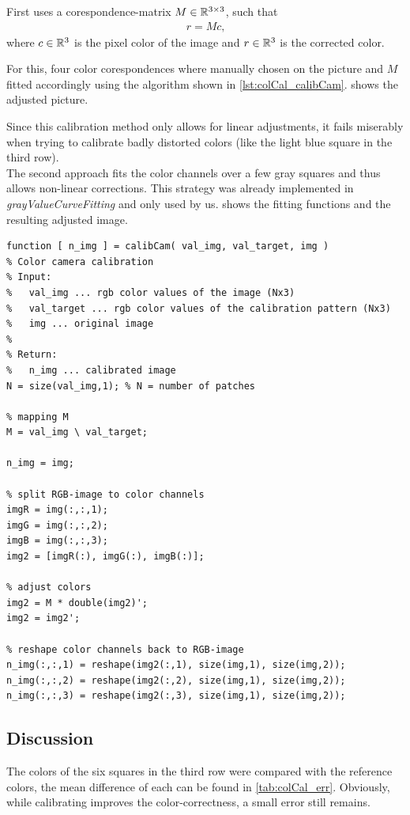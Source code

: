 \documentclass[
a4paper,     %
11pt         %
]{scrartcl}  %
\begin{document}
First uses a corespondence-matrix $M \in \mathbb{R} ^{3\times 3}$, such that
\begin{align*}  r = M c \text{,} \end{align*}
where $c \in \mathbb{R}^3$ is the pixel color of the image and $r \in \mathbb{R}^3$ is the corrected color.

For this, four color corespondences where manually chosen on the picture and $M$ fitted accordingly using the algorithm shown in \cref{lst:colCal_calibCam}.  shows the adjusted picture.

Since this calibration method only allows for linear adjustments, it fails miserably when trying to calibrate badly distorted colors (like the light blue square in the third row). \\

The second approach fits the color channels over a few gray squares and thus allows non-linear corrections. This strategy was already implemented in \textit{grayValueCurveFitting} and only used by us.  shows the fitting functions and the resulting adjusted image.

\begin{lstlisting}[label=lst:colCal_calibCam, caption=MATLAB implementation of calibCam]
function [ n_img ] = calibCam( val_img, val_target, img )
% Color camera calibration
% Input:
%   val_img ... rgb color values of the image (Nx3)
%   val_target ... rgb color values of the calibration pattern (Nx3)
%   img ... original image
%
% Return:
%   n_img ... calibrated image
N = size(val_img,1); % N = number of patches

% mapping M
M = val_img \ val_target;

n_img = img;

% split RGB-image to color channels
imgR = img(:,:,1);
imgG = img(:,:,2);
imgB = img(:,:,3);
img2 = [imgR(:), imgG(:), imgB(:)];

% adjust colors
img2 = M * double(img2)';
img2 = img2';

% reshape color channels back to RGB-image
n_img(:,:,1) = reshape(img2(:,1), size(img,1), size(img,2));
n_img(:,:,2) = reshape(img2(:,2), size(img,1), size(img,2));
n_img(:,:,3) = reshape(img2(:,3), size(img,1), size(img,2));
\end{lstlisting}

\subsection{Discussion}
The colors of the six squares in the third row were compared with the reference colors, the mean difference of each can be found in \cref{tab:colCal_err}. Obviously, while calibrating improves the color-correctness, a small error still remains.
\end{document}
